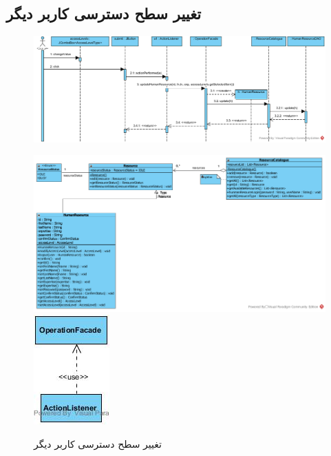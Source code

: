 \begin{landscape}
\section{تغییر سطح دسترسی کاربر دیگر}
\begin{figure}[H]
	\centering
	\includegraphics[scale=0.7]{img/sequence-design/ChangeAccessLevel}
\end{figure}
\begin{figure}[H]
	\centering
	\includegraphics[scale=0.7]{img/sequence-design/ChangeAccessLevelC}
	\includegraphics[scale=0.7]{img/sequence-design/ChangeAccessLevelUI}
	\caption{تغییر سطح دسترسی کاربر دیگر}
\end{figure}


\newpage

\end{landscape}
